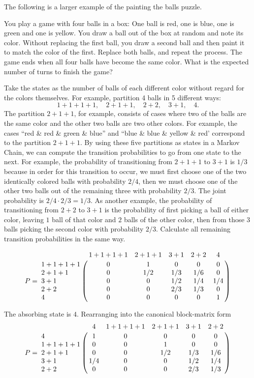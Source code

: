 \documentclass[12pt]{article}
\begin{document}
\begin{example}
    The following is a larger example of the painting the
    balls puzzle.

    You play a game with four balls in a box:  One ball is red, one is
    blue, one is green and one is yellow.  You draw a ball out of the
    box at random and note its color.  Without replacing the first ball,
    you draw a second ball and then paint it to match the color of the
    first.  Replace both balls, and repeat the process.  The game ends
    when all four balls have become the same color.  What is the
    expected number of turns to finish the game?  

    Take the states as the number of balls of each different color
    without regard for the colors themselves.  For example, partition 4
    balls in 5 different ways:
    \[
        1+1+1+1, \quad 2+1+1, \quad 2+2, \quad 3+1, \quad 4.
    \] The partition \( 2+1+1 \), for example, consists of cases where
    two of the balls are the same color and the other two balls are two
    other colors.  For example, the cases ``red \& red \& green \& blue''
    and ``blue \& blue \& yellow \& red' correspond to the partition \(
    2+1+1 \).  By using these five partitions as states in a Markov
    Chain, we can compute the transition probabilities to go from one
    state to the next.  For example, the probability of transitioning
    from \( 2+1+1 \) to \( 3+1 \) is \( 1/3 \) because in order
    for this transition to occur, we must first choose one of the two
    identically colored balls with probability \( 2/4 \), then
    we must choose one of the other two balls out of the remaining three
    with probability \( 2/3 \).  The joint probability is \(
    2/4 \cdot 2/3 = 1/3 \).  As another example,
    the probability of transitioning from \( 2 + 2 \) to \( 3 + 1 \) is
    the probability of first picking a ball of either color, leaving \(
    1 \) ball of that color and \( 2 \) balls of the other color, then
    from those \( 3 \) balls picking the second color with probability \(
    2/3 \).  Calculate all remaining transition probabilities in
    the same way.

    \[
        P =
        \bordermatrix{
            & 1+1+1+1 & 2+1+1 & 3 + 1 & 2 + 2 & 4 \cr
            1+1+1+1 & 0 & 1 & 0 & 0 & 0 \cr
            2+1+1 & 0 & 1/2 & 1/3 & 1/6 & 0 \cr
            3+1 & 0 & 0 & 1/2 & 1/4 & 1/4 \cr
            2+2 & 0 & 0 & 2/3 & 1/3 & 0 \cr
            4 & 0 & 0 & 0 & 0 & 1 \cr
        }
    \]

    The absorbing state is \( 4 \).  Rearranging into the canonical
    block-matrix form
    \[
        P =
        \bordermatrix{
            & 4 & 1+1+1+1 & 2+1+1 & 3 + 1 & 2 + 2 \cr
            4 & 1 & 0 & 0 & 0 & 0 \cr
            1+1+1+1 & 0 & 0 & 1 & 0 & 0 \cr
            2+1+1 & 0 & 0 & 1/2 & 1/3 & 1/6 \cr
            3+1 & 1/4 & 0 & 0 & 1/2 & 1/4 \cr
            2+2 & 0 & 0 & 0 & 2/3 & 1/3 \cr
        }
    \]


\end{example}
\end{document}
